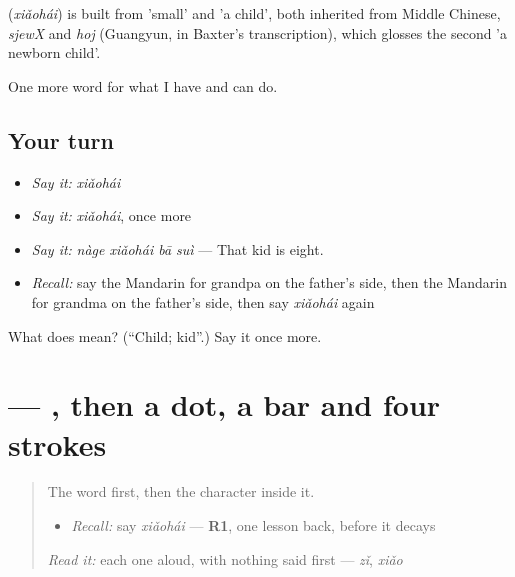 \begin{cousinweb}
\textbf{} (\emph{xiǎohái}) is built from  'small' and  'a child', both inherited from Middle Chinese, \emph{sjewX} and \emph{hoj} (Guangyun, in Baxter's transcription), which glosses the second 'a newborn child'.
\end{cousinweb}

\begin{grammarlens}[title={What you've built}]
One more word for what I have and can do.
\end{grammarlens}

\subsection*{Your turn}
\begin{itemize}
\raggedright
  \item \emph{Say it:} \emph{xiǎohái}
  \item \emph{Say it:} \emph{xiǎohái}, once more
  \item \emph{Say it:} \emph{nàge xiǎohái bā suì} — That kid is eight.
  \item \emph{Recall:} say the Mandarin for grandpa on the father's side, then the Mandarin for grandma on the father's side, then say \emph{xiǎohái} again
\end{itemize}

\begin{tcolorbox}[breakable,colback=teal!4,colframe=teal!35!black,title={Before you move on}]
What does  mean? (\textquotedblleft{}Child; kid\textquotedblright{}.) Say it once more.
\end{tcolorbox}
\section[\texorpdfstring{\zh{孩} (hái)}{孩 (hái)}]{ — , then a dot, a bar and four strokes}

\label{lesson:ZH-W253-hai-child}



\begin{quote}
The word first, then the character inside it.

\begin{itemize}
\raggedright
  \item \emph{Recall:} say \emph{xiǎohái} — \textbf{R1}, one lesson back, before it decays
\end{itemize}

\begin{quote}
 
\end{quote}

\emph{Read it:} each one aloud, with nothing said first — \emph{zǐ}, \emph{xiǎo}
\end{quote}

